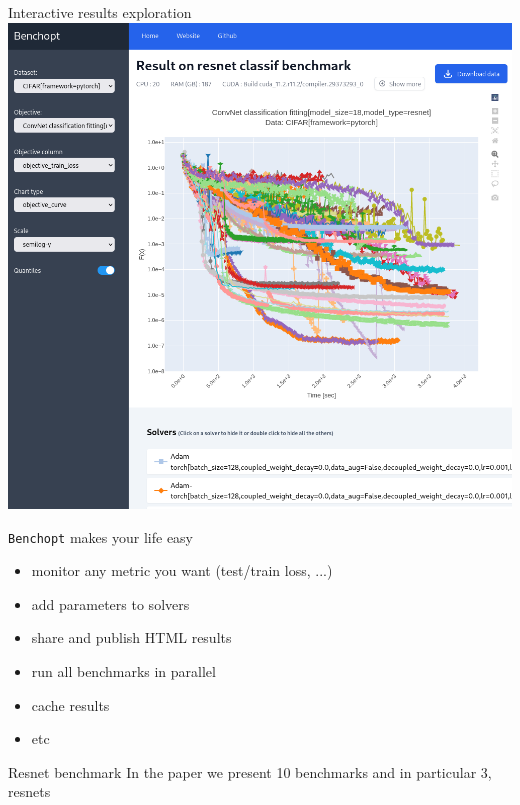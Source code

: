 \documentclass[unknownkeysallowed]{beamer}
\newcommand{\Benchopt}{\texttt{Benchopt}}
\begin{document}
\begin{frame}{Interactive results exploration}
    \centering
    \includegraphics[width=0.8\linewidth]{../sharedimages/benchopt_convnet.png}
\end{frame}


\begin{frame}{\Benchopt{} makes your life easy}

    \begin{itemize}
        \item monitor any metric you want (test/train loss, ...)
        \item add parameters to solvers
        \item share and publish HTML results
        \item run all benchmarks in parallel
        \item cache results
        \item etc
    \end{itemize}
\end{frame}


\begin{frame}{Resnet benchmark}
    In the paper we present 10 benchmarks and in particular 3, resnets
\end{frame}
\end{document}
